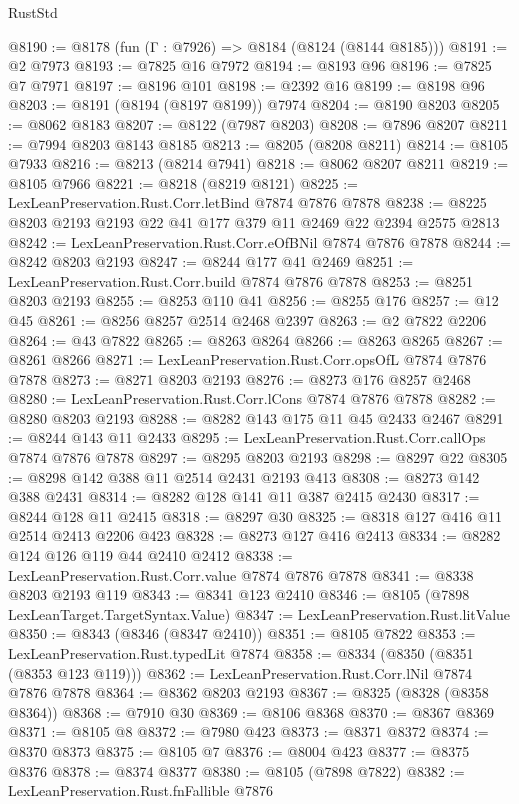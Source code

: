 \begin{lexlean}{RustStd}
\begin{coremodule}
{\begin{coremodule}
{{{{{{{{{{{{{{{{{{{{{{{{{{{{{{{{{{{{{{{{{{{{{{{{{{@8190 := @8178 (fun (Γ : @7926) => @8184 (@8124 (@8144 @8185)))
@8191 := @2 @7973
@8193 := @7825 @16 @7972
@8194 := @8193 @96
@8196 := @7825 @7 @7971
@8197 := @8196 @101
@8198 := @2392 @16
@8199 := @8198 @96
@8203 := @8191 (@8194 (@8197 @8199)) @7974
@8204 := @8190 @8203
@8205 := @8062 @8183
@8207 := @8122 (@7987 @8203)
@8208 := @7896 @8207
@8211 := @7994 @8203 @8143 @8185
@8213 := @8205 (@8208 @8211)
@8214 := @8105 @7933
@8216 := @8213 (@8214 @7941)
@8218 := @8062 @8207 @8211
@8219 := @8105 @7966
@8221 := @8218 (@8219 @8121)
@8225 := LexLeanPreservation.Rust.Corr.letBind @7874 @7876 @7878
@8238 := @8225 @8203 @2193 @2193 @22 @41 @177 @379 @11 @2469 @22 @2394 @2575 @2813
@8242 := LexLeanPreservation.Rust.Corr.eOfBNil @7874 @7876 @7878
@8244 := @8242 @8203 @2193
@8247 := @8244 @177 @41 @2469
@8251 := LexLeanPreservation.Rust.Corr.build @7874 @7876 @7878
@8253 := @8251 @8203 @2193
@8255 := @8253 @110 @41
@8256 := @8255 @176
@8257 := @12 @45
@8261 := @8256 @8257 @2514 @2468 @2397
@8263 := @2 @7822 @2206
@8264 := @43 @7822
@8265 := @8263 @8264
@8266 := @8263 @8265
@8267 := @8261 @8266
@8271 := LexLeanPreservation.Rust.Corr.opsOfL @7874 @7876 @7878
@8273 := @8271 @8203 @2193
@8276 := @8273 @176 @8257 @2468
@8280 := LexLeanPreservation.Rust.Corr.lCons @7874 @7876 @7878
@8282 := @8280 @8203 @2193
@8288 := @8282 @143 @175 @11 @45 @2433 @2467
@8291 := @8244 @143 @11 @2433
@8295 := LexLeanPreservation.Rust.Corr.callOps @7874 @7876 @7878
@8297 := @8295 @8203 @2193
@8298 := @8297 @22
@8305 := @8298 @142 @388 @11 @2514 @2431 @2193 @413
@8308 := @8273 @142 @388 @2431
@8314 := @8282 @128 @141 @11 @387 @2415 @2430
@8317 := @8244 @128 @11 @2415
@8318 := @8297 @30
@8325 := @8318 @127 @416 @11 @2514 @2413 @2206 @423
@8328 := @8273 @127 @416 @2413
@8334 := @8282 @124 @126 @119 @44 @2410 @2412
@8338 := LexLeanPreservation.Rust.Corr.value @7874 @7876 @7878
@8341 := @8338 @8203 @2193 @119
@8343 := @8341 @123 @2410
@8346 := @8105 (@7898 LexLeanTarget.TargetSyntax.Value)
@8347 := LexLeanPreservation.Rust.litValue
@8350 := @8343 (@8346 (@8347 @2410))
@8351 := @8105 @7822
@8353 := LexLeanPreservation.Rust.typedLit @7874
@8358 := @8334 (@8350 (@8351 (@8353 @123 @119)))
@8362 := LexLeanPreservation.Rust.Corr.lNil @7874 @7876 @7878
@8364 := @8362 @8203 @2193
@8367 := @8325 (@8328 (@8358 @8364))
@8368 := @7910 @30
@8369 := @8106 @8368
@8370 := @8367 @8369
@8371 := @8105 @8
@8372 := @7980 @423
@8373 := @8371 @8372
@8374 := @8370 @8373
@8375 := @8105 @7
@8376 := @8004 @423
@8377 := @8375 @8376
@8378 := @8374 @8377
@8380 := @8105 (@7898 @7822)
@8382 := LexLeanPreservation.Rust.fnFallible @7876
}}}}}}}}}}}}}}}}}}}}}}}}}}}}}}}}}}}}}}}}}}}}}}}}}}
\end{coremodule}}
\end{coremodule}
\end{lexlean}
